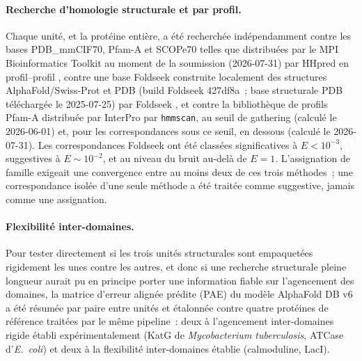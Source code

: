 \documentclass[11pt,a4paper]{article}
\newcommand{\mtb}{\textit{Mycobacterium tuberculosis}}
\begin{document}
\paragraph{Recherche d'homologie structurale et par profil.} Chaque unité, et la protéine entière,
a été recherchée indépendamment contre les bases PDB\_mmCIF70, Pfam-A et SCOPe70 telles que
distribuées par le MPI Bioinformatics Toolkit au moment de la soumission (2026-07-31) par HHpred en
profil--profil \citep{zimmermann2018hhpred}, contre une base Foldseek construite localement des
structures AlphaFold/Swiss-Prot et PDB (build Foldseek 427df8a~; base structurale PDB téléchargée
le 2025-07-25) par Foldseek \citep{vankempen2024foldseek}, et contre la bibliothèque de profils
Pfam-A distribuée par InterPro \citep{paysanlafosse2023interpro} par \texttt{hmmscan}, au seuil de
gathering (calculé le 2026-06-01) et, pour les correspondances sous ce seuil, en dessous (calculé
le 2026-07-31). Les correspondances Foldseek ont été classées significatives à $E<10^{-3}$,
suggestives à $E\sim10^{-2}$, et au niveau du bruit au-delà de $E=1$. L'assignation de famille
exigeait une convergence entre au moins deux de ces trois méthodes~; une correspondance isolée
d'une seule méthode a été traitée comme suggestive, jamais comme une assignation.

\paragraph{Flexibilité inter-domaines.} Pour tester directement si les trois unités structurales
sont empaquetées rigidement les unes contre les autres, et donc si une recherche structurale pleine
longueur aurait pu en principe porter une information fiable sur l'agencement des domaines, la
matrice d'erreur alignée prédite (PAE) du modèle AlphaFold DB v6 a été résumée par paire entre
unités et étalonnée contre quatre protéines de référence traitées par le même pipeline~: deux à
l'agencement inter-domaines rigide établi expérimentalement (KatG de \mtb{}, ATCase d'\textit{E.\
coli}) et deux à la flexibilité inter-domaines établie (calmoduline, LacI).
\end{document}
